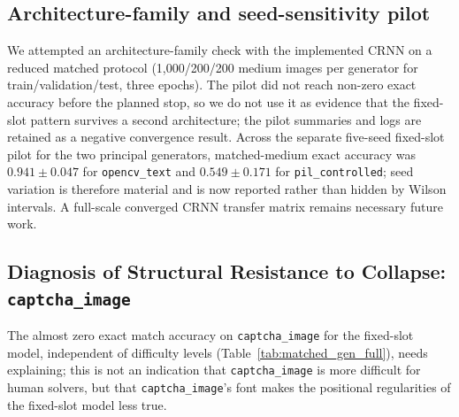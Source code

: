 \documentclass[pdflatex,sn-mathphys-num,iicol]{sn-jnl}
\begin{document}
\begin{table}[!htbp]
    \centering
    \caption{Training history on the controlled clean benchmark. The model converges to near-perfect validation accuracy within three epochs.}
    \label{tab:history}
\end{table}
\subsection{Architecture-family and seed-sensitivity pilot}
We attempted an architecture-family check with the implemented CRNN on a reduced matched protocol (1,000/200/200 medium images per generator for train/validation/test, three epochs). The pilot did not reach non-zero exact accuracy before the planned stop, so we do not use it as evidence that the fixed-slot pattern survives a second architecture; the pilot summaries and logs are retained as a negative convergence result. Across the separate five-seed fixed-slot pilot for the two principal generators, matched-medium exact accuracy was $0.941\pm0.047$ for \texttt{opencv\_text} and $0.549\pm0.171$ for \texttt{pil\_controlled}; seed variation is therefore material and is now reported rather than hidden by Wilson intervals. A full-scale converged CRNN transfer matrix remains necessary future work.

\subsection{Diagnosis of Structural Resistance to Collapse: \texttt{captcha\_image}}
\label{sec:captcha_image_diagnosis}

The almost zero exact match accuracy on \texttt{captcha\_image} for the
fixed-slot model, independent of difficulty levels
(Table~\ref{tab:matched_gen_full}), needs explaining; this is not an indication
that \texttt{captcha\_image} is more difficult for human solvers, but that
\texttt{captcha\_image}'s font makes the positional regularities of the fixed-slot
model less true.
\end{document}
